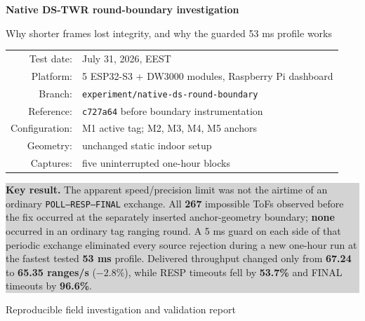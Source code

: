 \documentclass[11pt,a4paper]{article}
\newcommand{\dstwr}{DS-TWR}
\begin{document}

\begin{titlepage}
  \centering
  \vspace*{14mm}
  {\Huge\bfseries Native \dstwr{} round-boundary investigation\par}
  \vspace{4mm}
  {\Large Why shorter frames lost integrity, and why the guarded 53 ms profile works\par}
  \vspace{14mm}

  \begin{tabular}{rl}
    Test date: & July 31, 2026, EEST\\
    Platform: & 5 ESP32-S3 + DW3000 modules, Raspberry Pi dashboard\\
    Branch: & \texttt{experiment/native-ds-round-boundary}\\
    Reference: & \texttt{c727a64} before boundary instrumentation\\
    Configuration: & M1 active tag; M2, M3, M4, M5 anchors\\
    Geometry: & unchanged static indoor setup\\
    Captures: & five uninterrupted one-hour blocks\\
  \end{tabular}

  \vfill
  \colorbox{lightgray}{%
    \begin{minipage}{0.88\textwidth}
      \vspace{3mm}
      \textbf{Key result.}
      The apparent speed/precision limit was not the airtime of an ordinary
      \texttt{POLL--RESP--FINAL} exchange. All \textbf{267} impossible ToFs
      observed before the fix occurred at the separately inserted
      anchor-geometry boundary; \textbf{none} occurred in an ordinary tag
      ranging round. A 5 ms guard on each side of that periodic exchange
      eliminated every source rejection during a new one-hour run at the
      fastest tested \textbf{53 ms} profile. Delivered throughput changed
      only from \textbf{67.24} to \textbf{65.35 ranges/s} ($-2.8\%$), while
      RESP timeouts fell by \textbf{53.7\%} and FINAL timeouts by
      \textbf{96.6\%}.
      \vspace{3mm}
    \end{minipage}}
  \vfill
  {\large Reproducible field investigation and validation report\par}
  \vspace{5mm}
\end{titlepage}
\end{document}
